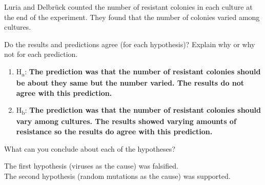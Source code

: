 \documentclass[12pt, addpoints]{exam}
\newcommand*\AnswerBox[2]{%
    \parbox[t][#1]{0.92\textwidth}{%
    \begin{solution}#2\end{solution}}
}
\begin{document}
\begin{questions}
\AnswerBox{5\baselineskip}{%
Luria and Delbrück counted the number of resistant colonies in each culture 
at the end of the experiment. They found that the number of colonies varied
among cultures.}

\question[2]
Do the results and predictions agree (for each hypothesis)? Explain why or why not for each prediction.

\begin{enumerate}[label=\alph*.]

	\item H\textsubscript{a}:
	\ifprintanswers
		\textbf{The prediction was that the number of resistant colonies should
		be about they same but the number varied. The results do not agree 
		with this prediction. }
		\vspace*{1\baselineskip}
	\else
		\vspace*{2\baselineskip}
	\fi

	\item H\textsubscript{b}: 
	\ifprintanswers
		\textbf{The prediction was that the number of resistant colonies should
		vary among cultures. The results showed varying amounts of resistance
		so the results do agree with this prediction. }
		\vspace*{1\baselineskip}
	\else
		\vspace*{2\baselineskip}
	\fi

\end{enumerate}

\question[2]
What can you conclude about each of the hypotheses?

\AnswerBox{5\baselineskip}{%
The first hypothesis (viruses as the cause) was falsified.\\
The second hypothesis (random mutations as the cause) was supported.
}

\end{questions}
\end{document}
